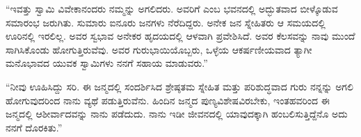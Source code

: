  “ಇವತ್ತು ಸ್ವಾಮಿ ವಿವೇಕಾನಂದರು ನಮ್ಮನ್ನು ಅಗಲಿದರು. ಅವರಿಗೆ  ಎಂಬ ಭವನದಲ್ಲಿ ಅದ್ಭುತವಾದ ಬೀಳ್ಕೊಡುವ ಸಮಾರಂಭ ಜರುಗಿತು. ಸುಮಾರು ಐನೂರು ಜನಗಳು ನೆರೆದಿದ್ದರು. ಅನೇಕ ಜನ ಸ್ನೇಹಿತರು ಆ ಸಮಯದಲ್ಲಿ ಊರಿನಲ್ಲಿ ಇರಲಿಲ್ಲ. ಅವರ ಸ್ವಭಾವ ಅನೇಕರ ಹೃದಯದಲ್ಲಿ ಆಳವಾಗಿ ಪ್ರವೇಶಿಸಿದೆ. ಅವರ ಕೆಲಸವನ್ನು ನಾವು ಮುಂದೆ ಸಾಗಿಸಿಕೊಂಡು ಹೋಗುತ್ತಿರುವೆವು. ಅವರ ಗುರುಭಾಯಿಯೊಬ್ಬರು, ಒಳ್ಳೆಯ ಆಕರ್ಷಣೀಯವಾದ ತ್ಯಾಗೀ ಮನೊಭಾವದ ಯುವಕ ಸ್ವಾಮಿಗಳು ನನಗೆ ಸಹಾಯ ಮಾಡುವರು.” 

 “ನೀವು ಊಹಿಸಿದ್ದು ಸರಿ. ಈ ಜನ್ಮದಲ್ಲಿ ಸಂದರ್ಶಿಸಿದ ಶ್ರೇಷ್ಠತಮ ಸ್ನೇಹಿತ ಮತ್ತು ಪರಿಶುದ್ಧವಾದ ಗುರು ನನ್ನನ್ನು ಅಗಲಿ ಹೋಗುವುದರಿಂದ ನಾನು ವ್ಯಥೆ ಪಡುತ್ತಿರುವೆನು. ಹಿಂದಿನ ಜನ್ಮದ ಪುಣ್ಯವಿಶೇಷವಿರಬೇಕು, ಇಂತಹವರಿಂದ ಈ ಜನ್ಮದಲ್ಲಿ ಆಶೀರ್ವಾದವನ್ನು ನಾನು ಪಡೆದುದು. ನಾನು ಇಡೀ ಜೀವನದಲ್ಲಿ ಯಾವುದಕ್ಕಾಗಿ ಹಂಬಲಿಸುತ್ತಿದ್ದೆನೊ ಅದು ನನಗೆ ದೊರಕಿತು.”

